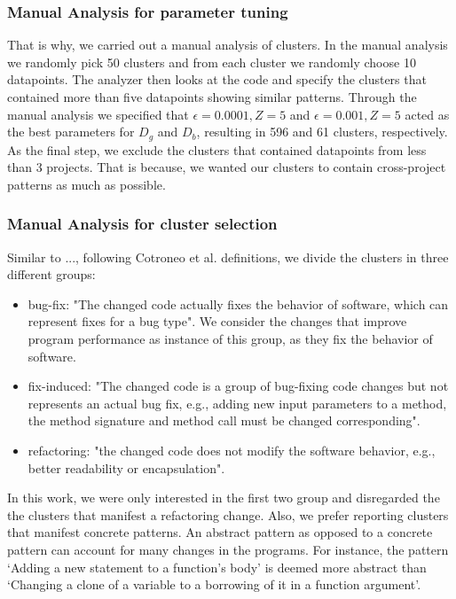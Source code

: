 \subsubsection{Manual Analysis for parameter tuning}

That is why, we carried out a manual analysis of clusters. In the manual analysis we randomly pick 50 clusters and from each cluster we randomly choose 10 datapoints. The analyzer then looks at the code and specify the clusters that contained more than five datapoints showing similar patterns. Through the manual analysis we specified that $\epsilon=0.0001, Z=5$ and $\epsilon=0.001, Z=5$ acted as the best parameters for $D_g$ and $D_b$, resulting in 596 and 61 clusters, respectively. As the final step, we exclude the clusters that contained datapoints from less than 3 projects. That is because, we wanted our clusters to contain cross-project patterns as much as possible.  

\subsubsection{Manual Analysis for cluster selection}

Similar to ..., following Cotroneo et al. definitions, we divide the clusters in three different groups:

\begin{itemize}
    \item bug-fix: "The changed code actually fixes the behavior of software, which can represent fixes for a bug type". We consider the changes that improve program performance as instance of this group, as they fix the behavior of software.
    
    \item fix-induced: "The changed code is a group of bug-fixing code changes but not represents an actual bug fix, e.g., adding new input parameters to a method, the method signature and method call must be changed corresponding".
    
    \item refactoring: "the changed code does not modify the software behavior, e.g., better readability or encapsulation".
\end{itemize}

In this work, we were only interested in the first two group and disregarded the the clusters that manifest a refactoring change. Also, we prefer reporting clusters that manifest concrete patterns. An abstract pattern as opposed to a concrete pattern can account for many changes in the programs. For instance, the pattern `Adding a new statement to a function's body' is deemed more abstract than `Changing a clone of a variable to a borrowing of it in a function argument'.

